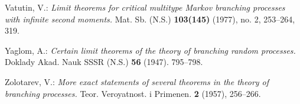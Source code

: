 \documentclass[12pt,a4paper]{amsart}
\theoremstyle{definition}
\numberwithin{equation}{section}
\begin{document}
\begin{thebibliography}{10}
	
	Vatutin, V.:
	\emph{Limit theorems for critical multitype Markov branching processes with infinite second moments.}
	Mat. Sb. (N.S.) \textbf{103(145)} (1977), no. 2, 253–264, 319.

	
	Yaglom, A.:
	\emph{Certain limit theorems of the theory of branching random processes.}
	Doklady Akad. Nauk SSSR (N.S.) \textbf{56} (1947). 795–798.

	
	Zolotarev, V.:
	\emph{More exact statements of several theorems in the theory of branching processes.}
	Teor. Veroyatnost. i Primenen. \textbf{2} (1957), 256–266.
	
	
\end{thebibliography}
\end{document}

